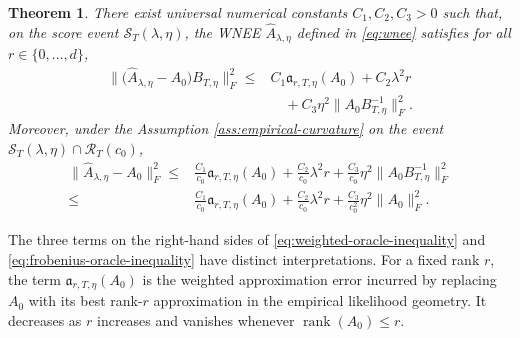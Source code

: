 \documentclass[11pt]{article}
\newtheorem{theorem}{Theorem}[section]
\begin{document}
\begin{theorem}
\label{thm:oracle-inequalities}
There exist universal numerical constants $C_1,C_2,C_3>0$ such that, on the
score event $\mathcal S_T(\lambda,\eta)$, the WNEE
$\widehat A_{\lambda,\eta}$ defined in \eqref{eq:wnee} satisfies for all $r\in\{0,\ldots,d\}$,
\begin{equation}
\begin{aligned}
    \big\|\big(\widehat A_{\lambda,\eta}-A_0\big)B_{T,\eta}\big\|_F^2
    \leq{}&
    C_1\mathfrak a_{r,T,\eta}(A_0)
    +C_2\lambda^2r \\
    &\quad
    +C_3\eta^2\big\|A_0B_{T,\eta}^{-1}\big\|_F^2.
\end{aligned}
\label{eq:weighted-oracle-inequality}
\end{equation}
Moreover, under the Assumption \ref{ass:empirical-curvature} on the event
$\mathcal S_T(\lambda,\eta)\cap\mathcal R_T(c_0)$,
\begin{equation}
\begin{aligned}
    \big\|\widehat A_{\lambda,\eta}-A_0\big\|_F^2
    \leq{}&
    \frac{C_1}{c_0}\mathfrak a_{r,T,\eta}(A_0)
    +\frac{C_2}{c_0}\lambda^2r 
    +\frac{C_3}{c_0}\eta^2
    \big\|A_0B_{T,\eta}^{-1}\big\|_F^2 \\
    \leq &
    \frac{C_1}{c_0}\mathfrak a_{r,T,\eta}(A_0)
    +\frac{C_2}{c_0}\lambda^2r+
    \frac{C_3}{c_0^2}\eta^2\|A_0\|_F^2.
\end{aligned}
\label{eq:frobenius-oracle-inequality}
\end{equation}
\end{theorem}


The three terms on the right-hand sides of \eqref{eq:weighted-oracle-inequality}
and \eqref{eq:frobenius-oracle-inequality} have distinct interpretations. For a
fixed rank $r$, the term $\mathfrak a_{r,T,\eta}(A_0)$ is the weighted
approximation error incurred by replacing $A_0$ with its best rank-$r$
approximation in the empirical likelihood geometry. It decreases as
$r$ increases and vanishes whenever $\operatorname{rank}(A_0)\le r$. 
\end{document}
